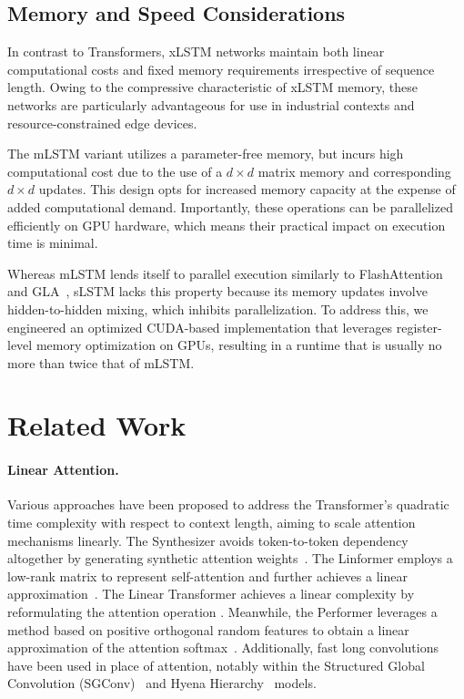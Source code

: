 \subsection{Memory and Speed Considerations}

In contrast to Transformers, xLSTM networks maintain both linear computational costs and fixed memory requirements irrespective of sequence length. Owing to the compressive characteristic of xLSTM memory, these networks are particularly advantageous for use in industrial contexts and resource-constrained edge devices.

The mLSTM variant utilizes a parameter-free memory, but incurs high computational cost due to the use of a $d \times d$ matrix memory and corresponding $d \times d$ updates. This design opts for increased memory capacity at the expense of added computational demand. Importantly, these operations can be parallelized efficiently on GPU hardware, which means their practical impact on execution time is minimal.

Whereas mLSTM lends itself to parallel execution similarly to FlashAttention~\citep{Dao:22,Dao:23} and GLA~\citep{Yang:23arxiv}, sLSTM lacks this property because its memory updates involve hidden-to-hidden mixing, which inhibits parallelization. To address this, we engineered an optimized CUDA-based implementation that leverages register-level memory optimization on GPUs, resulting in a runtime that is usually no more than twice that of mLSTM.

\section{Related Work}
\label{sec:related}

\paragraph{Linear Attention.} Various approaches have been proposed to address the Transformer's quadratic time complexity with respect to context length, aiming to scale attention mechanisms linearly. The Synthesizer avoids token-to-token dependency altogether by generating synthetic attention weights~\citep{Tay:20arxiv}. The Linformer employs a low-rank matrix to represent self-attention and further achieves a linear approximation~\citep{Wang:20arxiv}. The Linear Transformer achieves a linear complexity by reformulating the attention operation \citep{Katharopoulos:20}. Meanwhile, the Performer leverages a method based on positive orthogonal random features to obtain a linear approximation of the attention softmax~\citep{Choromanski:21}. Additionally, fast long convolutions have been used in place of attention, notably within the Structured Global Convolution (SGConv)~\citep{Li:22} and Hyena Hierarchy~\citep{Poli:23} models.

